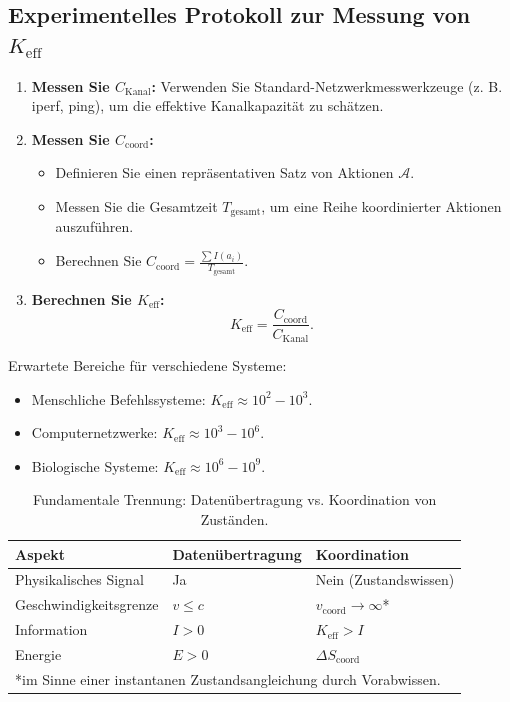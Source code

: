 \documentclass[12pt]{article}
\begin{document}
	\subsection{Experimentelles Protokoll zur Messung von $K_{\mathrm{eff}}$}
	\label{app:experiment}
	
	\begin{enumerate}
		\item \textbf{Messen Sie $C_{\text{Kanal}}$:} Verwenden Sie Standard-Netzwerkmesswerkzeuge (z. B. iperf, ping), um die effektive Kanalkapazität zu schätzen.
		
		\item \textbf{Messen Sie $C_{\text{coord}}$:}
		\begin{itemize}
			\item Definieren Sie einen repräsentativen Satz von Aktionen $\mathcal{A}$.
			\item Messen Sie die Gesamtzeit $T_{\text{gesamt}}$, um eine Reihe koordinierter Aktionen auszuführen.
			\item Berechnen Sie $C_{\text{coord}} = \frac{\sum I(a_i)}{T_{\text{gesamt}}}$.
		\end{itemize}
		
		\item \textbf{Berechnen Sie $K_{\mathrm{eff}}$:}
		\[
		K_{\mathrm{eff}} = \frac{C_{\text{coord}}}{C_{\text{Kanal}}}.
		\]
	\end{enumerate}
	
	Erwartete Bereiche für verschiedene Systeme:
	\begin{itemize}
		\item Menschliche Befehlssysteme: $K_{\mathrm{eff}} \approx 10^2 - 10^3$.
		\item Computernetzwerke: $K_{\mathrm{eff}} \approx 10^3 - 10^6$.
		\item Biologische Systeme: $K_{\mathrm{eff}} \approx 10^6 - 10^9$.
	\end{itemize}
	
	\begin{table}[htbp]
		\centering
		\caption{Fundamentale Trennung: Datenübertragung vs. Koordination von Zuständen.}
		\label{tab:separation}
		\begin{tabular}{lp{6cm}p{6cm}}
			\toprule
			\textbf{Aspekt} & \textbf{Datenübertragung} & \textbf{Koordination} \\
			\midrule
			Physikalisches Signal & Ja & Nein (Zustandswissen) \\
			Geschwindigkeitsgrenze & $v \leq c$ & $v_{\text{coord}} \to \infty$* \\
			Information & $I > 0$ & $K_{\text{eff}} > I$ \\
			Energie & $E > 0$ & $\Delta S_{\text{coord}}$ \\
			\bottomrule
			\multicolumn{3}{l}{*im Sinne einer instantanen Zustandsangleichung durch Vorabwissen.}
		\end{tabular}
	\end{table}
	
\end{document}
